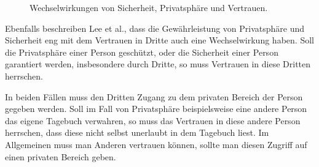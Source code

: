 \begin{figure}
    \centering
    \caption{Wechselwirkungen von Sicherheit, Privatsphäre und Vertrauen.}
    \label{fig:02:secprivtru}
\end{figure}

Ebenfalls beschreiben Lee et al., dass die Gewährleistung von Privatsphäre und Sicherheit
eng mit dem Vertrauen in Dritte auch eine Wechselwirkung haben. \cite{lee_ethical_2016}
Soll die Privatsphäre einer Person geschützt, oder die Sicherheit einer Person garantiert werden, insbesondere durch Dritte,   
so muss Vertrauen in diese Dritten herrschen.

In beiden Fällen muss den Dritten Zugang zu dem privaten Bereich der Person gegeben werden.
Soll im Fall von Privatsphäre beispielsweise eine andere Person das eigene Tagebuch verwahren,
so muss das Vertrauen in diese andere Person herrschen, dass diese nicht selbst unerlaubt in dem Tagebuch liest.
Im Allgemeinen muss man Anderen vertrauen können, sollte man diesen Zugriff auf einen privaten Bereich geben. 

